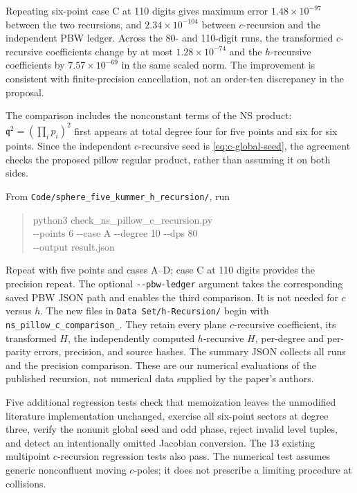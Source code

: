 \documentclass[11pt]{article}
\numberwithin{equation}{section}
\newcommand{\fq}{\mathfrak q}
\begin{document}
Repeating six-point case C at 110 digits gives maximum error
$1.48\times10^{-97}$ between the two recursions, and
$2.34\times10^{-104}$ between $c$-recursion and the independent PBW
ledger. Across the 80- and 110-digit runs, the transformed $c$-recursive
coefficients change by at most $1.28\times10^{-74}$ and the
$h$-recursive coefficients by $7.57\times10^{-69}$ in the same scaled
norm. The improvement is consistent with finite-precision cancellation,
not an order-ten discrepancy in the proposal.

The comparison includes the nonconstant terms of the NS product:
$\fq^2=(\prod_i p_i)^2$ first appears at total degree four for five
points and six for six points. Since the independent $c$-recursive seed
is \eqref{eq:c-global-seed}, the agreement checks the proposed pillow
regular product, rather than assuming it on both sides.

From \nolinkurl{Code/sphere_five_kummer_h_recursion/}, run
\begin{quote}\small\ttfamily
python3 check\_ns\_pillow\_c\_recursion.py\\
\hspace*{1em}-{}-points 6 -{}-case A -{}-degree 10 -{}-dps 80\\
\hspace*{1em}-{}-output result.json
\end{quote}
Repeat with five points and cases A--D; case C at 110 digits provides
the precision repeat. The optional \texttt{-{}-pbw-ledger} argument
takes the corresponding saved PBW JSON path and enables the third
comparison. It is not needed for $c$ versus $h$. The new files in
\texttt{Data Set/h-Recursion/} begin with
\texttt{ns\_pillow\_c\_comparison\_}. They retain every plane
$c$-recursive coefficient, its transformed $H$, the independently
computed $h$-recursive $H$, per-degree and per-parity errors, precision,
and source hashes. The summary JSON collects all runs and the precision
comparison. These are our numerical evaluations of the published
recursion, not numerical data supplied by the paper's authors.

Five additional regression tests check that memoization leaves the
unmodified literature implementation unchanged, exercise all six-point
sectors at degree three, verify the nonunit global seed and odd phase,
reject invalid level tuples, and detect an intentionally omitted
Jacobian conversion. The 13 existing multipoint $c$-recursion regression
tests also pass. The numerical test assumes generic nonconfluent moving
$c$-poles; it does not prescribe a limiting procedure at collisions.
\end{document}
